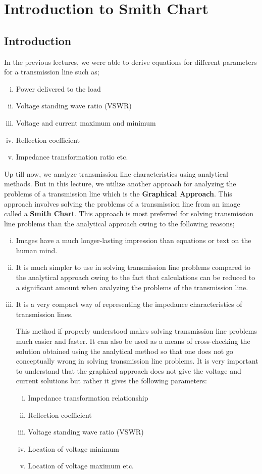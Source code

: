 \chapter{\textbf{Introduction to Smith Chart}}
\section{Introduction}
In the previous lectures, we were able to derive equations for different parameters for a transmission line such as;
\begin{enumerate}[(i)]
\item 	Power delivered to the load
\item	Voltage standing wave ratio (VSWR)
\item	Voltage and current maximum and minimum
\item	Reflection coefficient
\item	Impedance transformation ratio etc.
\end{enumerate}

Up till now, we analyze transmission line characteristics using analytical methods. But in this lecture, we utilize another approach for analyzing the problems of a transmission line which is the \textbf{Graphical Approach}.
This approach involves solving the problems of a transmission line from an image called a \textbf{Smith Chart}.
This approach is most preferred for solving transmission line problems than the analytical approach owing to the following reasons;\\
\begin{enumerate}[(i)]
\item Images have a much longer-lasting impression than equations or text on the human mind.
\item	It is much simpler to use in solving transmission line problems compared to the analytical approach owing to the fact that calculations can be reduced to a significant amount when analyzing the problems of the transmission line.
\item	It is a very compact way of representing the impedance characteristics of transmission lines.

This method if properly understood makes solving transmission line problems much easier and faster.  It can also be used as a means of cross-checking the solution obtained using the analytical method so that one does not go conceptually wrong in solving transmission line problems.
It is very important to understand that the graphical approach does not give the voltage and current solutions but rather it gives the following parameters:
\begin{enumerate}[(i)]
\item	Impedance transformation relationship 
\item Reflection coefficient
\item Voltage standing wave ratio (VSWR)
\item Location of voltage minimum
\item	Location of voltage maximum etc.
\end{enumerate}
\end{enumerate}

